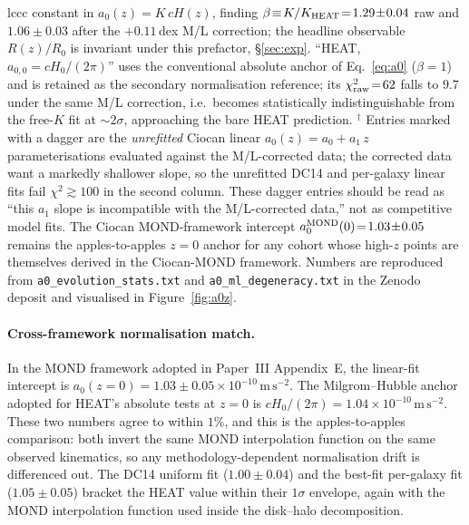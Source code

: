 \documentclass[twocolumn,letterpaper]{aastex631}
\newcommand{\azero}{a_0}
\newcommand{\azerolocal}{a_{0,0}}
\begin{document}
\begin{deluxetable*}{lccc}
{  constant in $\azero(z)=K\,cH(z)$, finding $\beta\!\equiv\!
  K/K_{\rm HEAT}\!=\!1.29\!\pm\!0.04$ raw and $1.06\!\pm\!0.03$
  after the $+0.11$\,dex M/L correction; the headline observable
  $R(z)/R_{0}$ is invariant under this prefactor, \S\ref{sec:exp}.
  ``HEAT, $\azerolocal\!=\!cH_0/(2\pi)$'' uses the conventional
  absolute anchor of Eq.~\ref{eq:a0} ($\beta\!=\!1$) and is
  retained as the secondary normalisation reference; its
  $\chi^{2}_{\rm raw}\!=\!62$ falls to $9.7$ under the same
  M/L correction, i.e.\ becomes statistically indistinguishable
  from the free-$K$ fit at $\sim 2\sigma$, approaching the bare
  HEAT prediction.
  $^{\dagger}$ Entries marked with a dagger are the
  \emph{unrefitted} Ciocan linear $\azero(z)\!=\!a_0\!+\!a_1\,z$
  parameterisations evaluated against the M/L-corrected
  data; the corrected data want a markedly shallower slope, so
  the unrefitted DC14 and per-galaxy linear fits fail
  $\chi^{2}\!\gtrsim\!100$ in the second column.  These dagger
  entries should be read as ``this $a_1$ slope is incompatible
  with the M/L-corrected data,'' not as competitive model fits.
  The Ciocan MOND-framework intercept
  $\azero^{\rm MOND}(0)\!=\!1.03\!\pm\!0.05$ remains the
  apples-to-apples $z\!=\!0$ anchor for any cohort whose high-$z$
  points are themselves derived in the Ciocan-MOND framework.
  Numbers are reproduced from \texttt{a0\_evolution\_stats.txt}
  and \texttt{a0\_ml\_degeneracy.txt} in the Zenodo deposit and
  visualised in
  Figure~\ref{fig:a0z}.}
\end{deluxetable*}

\paragraph{Cross-framework normalisation match.}  In the MOND
framework adopted in Paper~III Appendix~E, the linear-fit
intercept is $\azero(z\!=\!0)\!=\!1.03\!\pm\!0.05\!\times\!10^{-10}\,
\mathrm{m\,s^{-2}}$.  The Milgrom--Hubble anchor adopted for
HEAT's absolute tests at
$z\!=\!0$ is $cH_{0}/(2\pi)\!=\!1.04\!\times\!10^{-10}\,
\mathrm{m\,s^{-2}}$.  These two numbers agree to within $1\%$,
and this is the apples-to-apples comparison: both invert the
same MOND interpolation function on the same observed
kinematics, so any methodology-dependent normalisation drift
is differenced out.  The DC14 uniform fit
($1.00\!\pm\!0.04$) and the best-fit per-galaxy fit
($1.05\!\pm\!0.05$) bracket the HEAT value within their
$1\sigma$ envelope, again with the MOND interpolation
function used inside the disk--halo decomposition.
\end{document}
